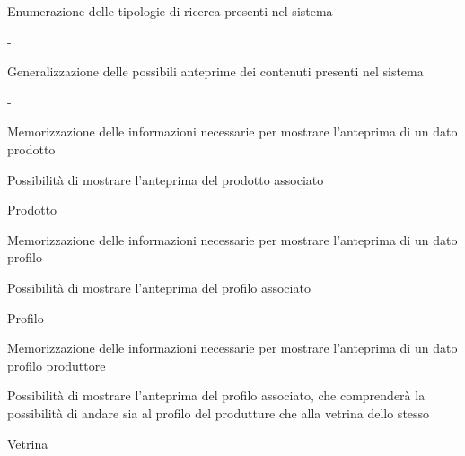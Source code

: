 
{\begin{itemWork}
	\item Enumerazione delle tipologie di ricerca presenti nel sistema
\end{itemWork}}
{-}


{\begin{itemWork}
	\item Generalizzazione delle possibili anteprime dei contenuti presenti nel sistema
\end{itemWork}}
{-}


{\begin{itemWork}
	\item Memorizzazione delle informazioni necessarie per mostrare l'anteprima di un dato prodotto
	\item Possibilità di mostrare l'anteprima del prodotto associato
\end{itemWork}}
{\begin{itemWork}
	\item Prodotto
\end{itemWork}}


{\begin{itemWork}
	\item Memorizzazione delle informazioni necessarie per mostrare l'anteprima di un dato profilo
	\item Possibilità di mostrare l'anteprima del profilo associato
\end{itemWork}}
{\begin{itemWork}
	\item Profilo
\end{itemWork}}


{\begin{itemWork}
	\item Memorizzazione delle informazioni necessarie per mostrare l'anteprima di un dato profilo produttore
	\item Possibilità di mostrare l'anteprima del profilo associato, che comprenderà la possibilità di andare sia al profilo del produtture che alla vetrina dello stesso
\end{itemWork}}
{\begin{itemWork}
	\item Vetrina
\end{itemWork}}

